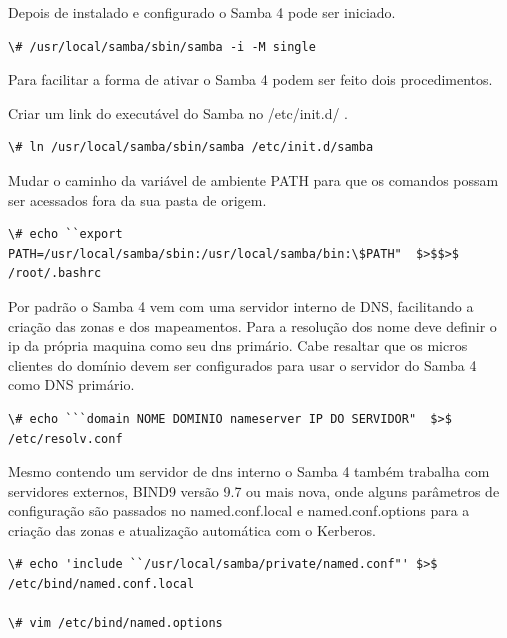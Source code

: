 
Depois de instalado e configurado o Samba 4 pode ser iniciado.

\begin{lstlisting}
\# /usr/local/samba/sbin/samba -i -M single
\end{lstlisting}

Para facilitar a forma de ativar o Samba 4 podem ser feito dois procedimentos.

Criar um link do executável do Samba no /etc/init.d/ .

\begin{lstlisting}
\# ln /usr/local/samba/sbin/samba /etc/init.d/samba
\end{lstlisting}

Mudar o caminho da variável de ambiente PATH para que os comandos possam ser acessados fora da sua pasta de origem.

\begin{lstlisting}
\# echo ``export PATH=/usr/local/samba/sbin:/usr/local/samba/bin:\$PATH"  $>$$>$ /root/.bashrc
\end{lstlisting}

Por padrão o Samba 4 vem com uma servidor interno de DNS, facilitando a criação das zonas e dos mapeamentos. Para a resolução dos nome deve definir o ip da própria maquina como seu dns primário. Cabe resaltar que os micros clientes do domínio devem ser configurados para usar o servidor do Samba 4 como DNS primário.

\begin{lstlisting}
\# echo ```domain NOME DOMINIO nameserver IP DO SERVIDOR"  $>$ /etc/resolv.conf
\end{lstlisting}

Mesmo contendo um servidor de dns interno o Samba 4 também trabalha com servidores externos, BIND9 versão 9.7 ou mais nova, onde alguns parâmetros de configuração são passados no named.conf.local e named.conf.options para a criação das zonas e atualização automática com o Kerberos.

\begin{lstlisting}
\# echo 'include ``/usr/local/samba/private/named.conf"' $>$ /etc/bind/named.conf.local

\# vim /etc/bind/named.options
\end{lstlisting}

